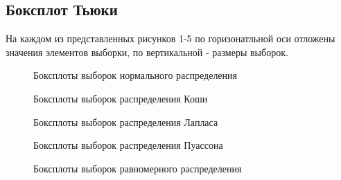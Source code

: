 \documentclass[12pt]{article}
\begin{document}
\subsection{Боксплот Тьюки}
На каждом из представленных рисунков 1-5 по горизонатльной оси отложены значения элементов выборки, по вертикальной - размеры выборок.\\
\begin{figure}[h]
	\caption{Боксплоты выборок нормального распределения}
\end{figure}
\begin{figure}[h]
	\caption{Боксплоты выборок распределения Коши}
\end{figure}
\newpage
\begin{figure}[h]
	\caption{Боксплоты выборок распределения Лапласа}
\end{figure}
\begin{figure}[h]
	\caption{Боксплоты выборок распределения Пуассона}
\end{figure}
\newpage
\begin{figure}[h]
	\caption{Боксплоты выборок равномерного распределения}
\end{figure}
\end{document}
